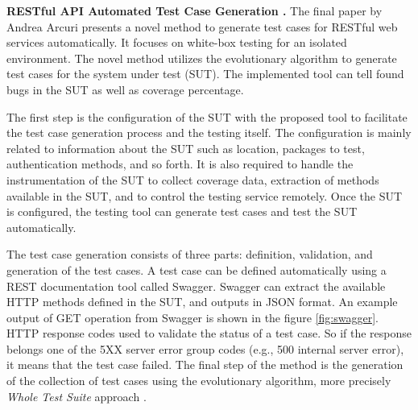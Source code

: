 \documentclass[english]{tktltiki}
\begin{document}
\textbf{RESTful API Automated Test Case Generation \cite{arcuri2017restful}.} The final paper by Andrea Arcuri \cite{arcuri2017restful} presents a novel method to generate test cases for RESTful web services automatically. It focuses on white-box testing for an isolated environment. The novel method utilizes the evolutionary algorithm to generate test cases for the system under test (SUT). The implemented tool can tell found bugs in the SUT as well as coverage percentage.

The first step is the configuration of the SUT with the proposed tool to facilitate the test case generation process and the testing itself. The configuration is mainly related to information about the SUT such as location, packages to test, authentication methods, and so forth. It is also required to handle the instrumentation of the SUT to collect coverage data, extraction of methods available in the SUT, and to control the testing service remotely. Once the SUT is configured, the testing tool can generate test cases and test the SUT automatically.

The test case generation consists of three parts: definition, validation, and generation of the test cases. A test case can be defined automatically using a REST documentation tool called Swagger. Swagger can extract the available HTTP methods defined in the SUT, and outputs in JSON format. An example output of GET operation from Swagger is shown in the figure \ref{fig:swagger}. HTTP response codes used to validate the status of a test case. So if the response belongs one of the 5XX server error group codes (e.g., 500 internal server error), it means that the test case failed. The final step of the method is the generation of the collection of test cases using the evolutionary algorithm, more precisely \textit{Whole Test Suite} approach \cite{fraser2013whole}.
\end{document}

